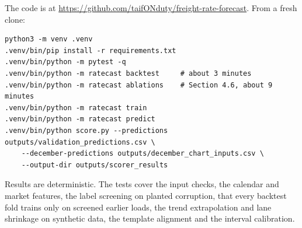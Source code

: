 \documentclass[11pt]{article}
\newcommand{\repo}{https://github.com/taifONduty/freight-rate-forecast}
\begin{document}
The code is at \url{\repo}. From a fresh clone:
\begin{verbatim}
python3 -m venv .venv
.venv/bin/pip install -r requirements.txt
.venv/bin/python -m pytest -q
.venv/bin/python -m ratecast backtest     # about 3 minutes
.venv/bin/python -m ratecast ablations    # Section 4.6, about 9 minutes
.venv/bin/python -m ratecast train
.venv/bin/python -m ratecast predict
.venv/bin/python score.py --predictions outputs/validation_predictions.csv \
    --december-predictions outputs/december_chart_inputs.csv \
    --output-dir outputs/scorer_results
\end{verbatim}
Results are deterministic. The tests cover the input checks, the calendar and market
features, the label screening on planted corruption, that every backtest fold trains only
on screened earlier loads, the trend extrapolation and lane shrinkage on synthetic data,
the template alignment and the interval calibration.
\end{document}

